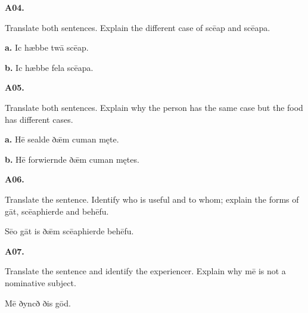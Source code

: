 \par\begin{minipage}{\linewidth}\raggedright
\textbf{A04.}

Translate both sentences. Explain the different case of scēap and scēapa.

\textbf{a.} Ic hæbbe twā scēap.

\textbf{b.} Ic hæbbe fela scēapa.

\end{minipage}\par\addvspace{4pt}

\par\begin{minipage}{\linewidth}\raggedright
\textbf{A05.}

Translate both sentences. Explain why the person has the same case but the food has different cases.

\textbf{a.} Hē sealde ðǣm cuman męte.

\textbf{b.} Hē forwiernde ðǣm cuman mętes.

\end{minipage}\par\addvspace{4pt}

\par\begin{minipage}{\linewidth}\raggedright
\textbf{A06.}

Translate the sentence. Identify who is useful and to whom; explain the forms of gāt, scēaphierde and behēfu.

Sēo gāt is ðǣm scēaphierde behēfu.

\end{minipage}\par\addvspace{4pt}

\par\begin{minipage}{\linewidth}\raggedright
\textbf{A07.}

Translate the sentence and identify the experiencer. Explain why mē is not a nominative subject.

Mē ðyncð ðis gōd.

\end{minipage}\par\addvspace{4pt}


